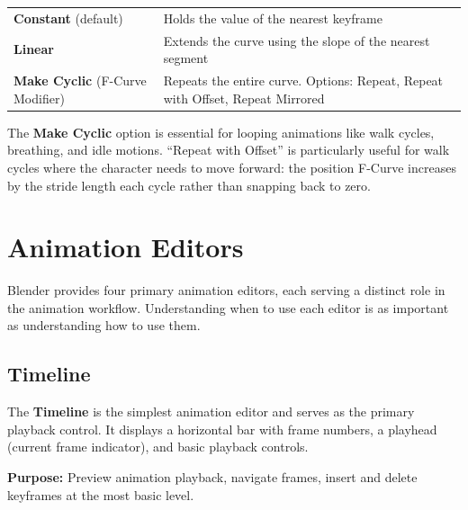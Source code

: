 \begin{center}
\begin{tabularx}{\textwidth}{L{3.5cm}X}
\toprule
{}
 &  \\
\midrule
\textbf{Constant} (default) & Holds the value of the nearest keyframe \\
\textbf{Linear} & Extends the curve using the slope of the nearest segment \\
\textbf{Make Cyclic} (F-Curve Modifier) & Repeats the entire curve. Options: Repeat, Repeat with Offset, Repeat Mirrored \\
\bottomrule
\end{tabularx}
\end{center}

The \textbf{Make Cyclic} option is essential for looping animations like walk cycles, breathing, and idle motions. ``Repeat with Offset'' is particularly useful for walk cycles where the character needs to move forward: the position F-Curve increases by the stride length each cycle rather than snapping back to zero.


\section{Animation Editors}
\label{sec:anim-editors}

Blender provides four primary animation editors, each serving a distinct role in the animation workflow. Understanding when to use each editor is as important as understanding how to use them.

\subsection{Timeline}
\label{subsec:timeline}

The \textbf{Timeline} is the simplest animation editor and serves as the primary playback control. It displays a horizontal bar with frame numbers, a playhead (current frame indicator), and basic playback controls.

\textbf{Purpose:} Preview animation playback, navigate frames, insert and delete keyframes at the most basic level.

